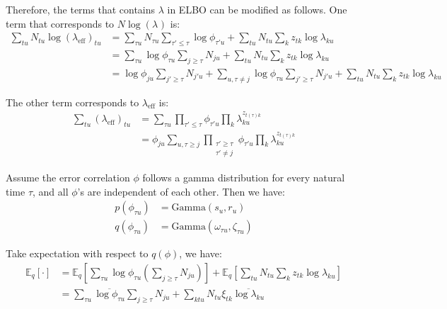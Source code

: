 \documentclass[11pt]{article}
\begin{document}
Therefore, the terms that contains $\lambda$ in ELBO can be modified as follows. One term that corresponds to $N\log(\lambda_{\mathrm{}})$ is:
\begin{align*}
    \sum_{tu} N_{tu} \log(\lambda_{\mathrm{eff}})_{tu}
    &= \sum_{\tau u} N_{\tau u} \sum_{\tau' \le \tau} \log\phi_{\tau' u} + \sum_{tu} N_{tu} \sum_k z_{tk} \log\lambda_{ku} \\
    &= \sum_{\tau u} \log\phi_{\tau u} \sum_{j \ge \tau}N_{ju} + \sum_{tu} N_{tu} \sum_k z_{tk} \log\lambda_{ku} \\
    &= \log\phi_{ju} \sum_{j' \ge \tau}N_{j'u} + \sum_{u, \tau \ne j} \log\phi_{\tau u} \sum_{j' \ge \tau}N_{j'u} + \sum_{tu} N_{tu} \sum_k z_{tk} \log\lambda_{ku}
\end{align*}

The other term corresponds to $\lambda_{\mathrm{eff}}$ is:
\begin{align}
    \sum_{tu}(\lambda_{\mathrm{eff}})_{tu} &= \sum_{\tau u} \prod_{\tau' \le \tau} \phi_{\tau' u} \prod_k \lambda_{ku}^{z_{t(\tau)k}} \\
    &= \phi_{ju} \sum_{u, \tau \ge j} \prod_{\substack{\tau' \ge \tau \\ \tau' \ne j}} \phi_{\tau'u} \prod_k \lambda_{ku}^{z_{t(\tau)k}}
\end{align}

Assume the error correlation $\phi$ follows a gamma distribution for every natural time $\tau$, and all $\phi$'s are independent of each other. Then we have:
\begin{align}
    p(\phi_{\tau u}) &= \mathrm{Gamma}(s_u, r_u) \\
    q(\phi_{\tau u}) &= \mathrm{Gamma}(\omega_{\tau u}, \zeta_{\tau u})
\end{align}

Take expectation with respect to $q(\phi)$, we have:
\begin{align}
    \mathbb{E}_{q}[\cdot] &= \mathbb{E}_{q} \left[\sum_{\tau u} \log\phi_{\tau u} (\sum_{j \ge \tau}N_{ju}) \right]
    + \mathbb{E}_{q}\left[\sum_{tu} N_{tu} \sum_k z_{tk} \log\lambda_{ku} \right] \\
    &= \sum_{\tau u}\overline{\log\phi_{\tau u}} \sum_{j \ge \tau}N_{ju} + \sum_{ktu} N_{tu}\xi_{tk} \overline{\log \lambda_{ku}}
\end{align}
\end{document}

